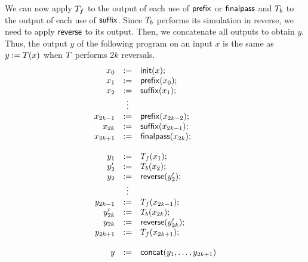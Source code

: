 We can now apply $T_f$ to the output of each use of $\mathsf{prefix}$ or
$\mathsf{finalpass}$ and $T_b$ to the output of each use of $\mathsf{suffix}$.
%
Since $T_b$ performs its simulation in reverse, we need to apply
$\mathsf{reverse}$ to its output.
%
Then, we concatenate all outputs to obtain $y$.
%
Thus, the output $y$ of the following program on an input $x$ is the same as
$y := T(x)$
when $T$ performs $2k$ reversals.
\[
    \begin{array}{rcl}
        x_0 &:=& \mathsf{init}(x); \\
        x_1 &:=& \mathsf{prefix}(x_0); \\
        x_2 &:=& \mathsf{suffix}(x_1); \\
        &\vdots& \\
        x_{2k-1} &:=& \mathsf{prefix}(x_{2k-2}); \\
        x_{2k} &:=& \mathsf{suffix}(x_{2k-1}); \\
        x_{2k+1} &:=& \mathsf{finalpass}(x_{2k}); \\
        \\
        y_1 &:=& T_f(x_1); \\
        y'_2 &:=& T_b(x_2); \\
        y_2 &:=& \mathsf{reverse}(y'_2); \\
        &\vdots& \\
        y_{2k-1} &:=& T_f(x_{2k-1}); \\
        y'_{2k} &:=& T_b(x_{2k}); \\
        y_{2k} &:=& \mathsf{reverse}(y'_{2k}); \\
        y_{2k+1} &:=& T_f(x_{2k+1}); \\
        \\
        y &:=& \mathsf{concat}(y_1, \ldots, y_{2k+1})
    \end{array}
\]

